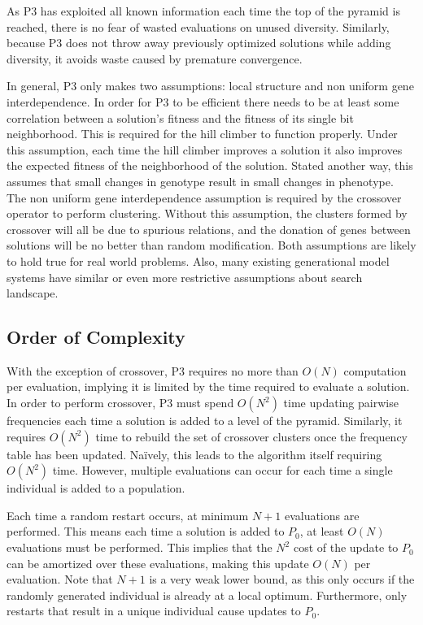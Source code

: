\documentclass{sig-alternate}
\begin{document}
As P3 has exploited all known information each time the top of the pyramid is reached,
there is no fear of wasted evaluations on unused diversity.  Similarly, because P3
does not throw away previously optimized solutions while adding diversity, it avoids
waste caused by premature convergence.

In general, P3 only makes two assumptions: local structure and non uniform gene interdependence.
In order for P3 to be efficient there needs to be at least some correlation between a
solution's fitness and the fitness of its single bit neighborhood.  This is required for
the hill climber to function properly.  Under this assumption, each time the hill climber
improves a solution it also improves the expected fitness of the neighborhood of the solution.
Stated another way, this assumes that small changes in genotype result in small changes in phenotype.
The non uniform gene interdependence assumption is required by the crossover operator to
perform clustering.  Without this assumption, the clusters formed by crossover will
all be due to spurious relations, and the donation of genes between solutions will be
no better than random modification.  Both assumptions are likely to hold true for
real world problems.  Also, many existing generational model systems have similar
or even more restrictive assumptions about search landscape.

\subsection{Order of Complexity}
With the exception of crossover, P3 requires no more than $O(N)$ computation
per evaluation, implying it is limited by the time required to evaluate a solution.
In order to perform crossover, P3 must spend $O(N^2)$ time updating pairwise
frequencies each time a solution is added to a level of the pyramid.  Similarly,
it requires $O(N^2)$ time to rebuild the set of crossover clusters once the frequency
table has been updated.  Na\"ively, this leads to the algorithm itself requiring $O(N^2)$ time.
However, multiple evaluations can occur for each time a single individual is added
to a population.

Each time a random restart occurs, at minimum $N+1$ evaluations are performed.
This means each time a solution is added to $P_0$, at least $O(N)$ evaluations
must be performed.  This implies that the $N^2$ cost of the update to $P_0$ can
be amortized over these evaluations, making this update $O(N)$ per evaluation.  Note
that $N+1$ is a very weak lower bound, as this only occurs if the randomly generated
individual is already at a local optimum.  Furthermore, only restarts that result
in a unique individual cause updates to $P_0$.
\end{document}
